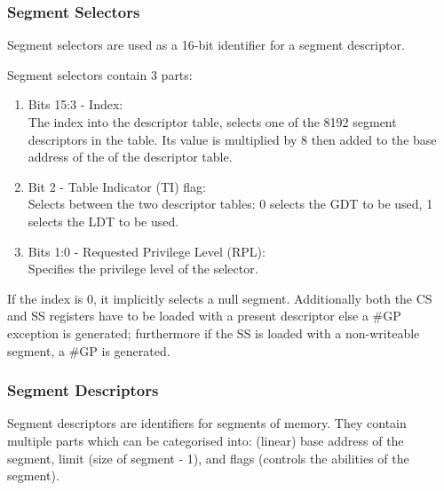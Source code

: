 \documentclass{article}
\newcommand{\layout}[1]{\parbox{\linewidth}{#1}}
\begin{document}
\layout{
  \subsubsection{Segment Selectors}

  Segment selectors are used as a 16-bit identifier for a segment descriptor.
} \bigskip

\layout{
  Segment selectors contain 3 parts:
  \begin{enumerate}
    \item Bits 15:3 - Index: \\
      The index into the descriptor table, selects one of the 8192 segment descriptors in the table.
      Its value is multiplied by 8 then added to the base address of the of the descriptor table.
    \item Bit 2 - Table Indicator (TI) flag: \\
      Selects between the two descriptor tables: 0 selects the GDT to be used, 1 selects the LDT to be used.
    \item Bits 1:0 - Requested Privilege Level (RPL): \\
      Specifies the privilege level of the selector.
  \end{enumerate}
}

\layout{
  If the index is 0, it implicitly selects a null segment.
  Additionally both the CS and SS registers have to be loaded with a present descriptor else a \#GP exception is generated; furthermore if the SS is loaded with a non-writeable segment, a \#GP is generated.

  \bigskip \cite[Chapter~3.4.2]{sdm3}
}

\layout{
  \subsubsection{Segment Descriptors}

  Segment descriptors are identifiers for segments of memory.
  They contain multiple parts which can be categorised into: (linear) base address of the segment, limit (size of segment - 1), and flags (controls the abilities of the segment).
} \bigskip
\end{document}
